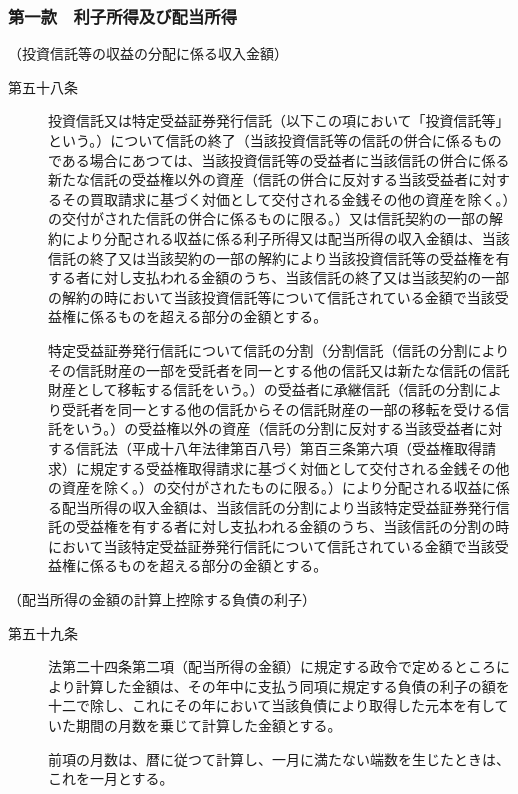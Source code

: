 \documentclass[twocolumn,a4j,10pt]{ltjtarticle}
\begin{document}
\subsubsection*{第一款　利子所得及び配当所得}
\noindent\hspace{10pt}（投資信託等の収益の分配に係る収入金額）
\begin{description}
\item[第五十八条]投資信託又は特定受益証券発行信託（以下この項において「投資信託等」という。）について信託の終了（当該投資信託等の信託の併合に係るものである場合にあつては、当該投資信託等の受益者に当該信託の併合に係る新たな信託の受益権以外の資産（信託の併合に反対する当該受益者に対するその買取請求に基づく対価として交付される金銭その他の資産を除く。）の交付がされた信託の併合に係るものに限る。）又は信託契約の一部の解約により分配される収益に係る利子所得又は配当所得の収入金額は、当該信託の終了又は当該契約の一部の解約により当該投資信託等の受益権を有する者に対し支払われる金額のうち、当該信託の終了又は当該契約の一部の解約の時において当該投資信託等について信託されている金額で当該受益権に係るものを超える部分の金額とする。
\item[]特定受益証券発行信託について信託の分割（分割信託（信託の分割によりその信託財産の一部を受託者を同一とする他の信託又は新たな信託の信託財産として移転する信託をいう。）の受益者に承継信託（信託の分割により受託者を同一とする他の信託からその信託財産の一部の移転を受ける信託をいう。）の受益権以外の資産（信託の分割に反対する当該受益者に対する信託法（平成十八年法律第百八号）第百三条第六項（受益権取得請求）に規定する受益権取得請求に基づく対価として交付される金銭その他の資産を除く。）の交付がされたものに限る。）により分配される収益に係る配当所得の収入金額は、当該信託の分割により当該特定受益証券発行信託の受益権を有する者に対し支払われる金額のうち、当該信託の分割の時において当該特定受益証券発行信託について信託されている金額で当該受益権に係るものを超える部分の金額とする。
\end{description}
\noindent\hspace{10pt}（配当所得の金額の計算上控除する負債の利子）
\begin{description}
\item[第五十九条]法第二十四条第二項（配当所得の金額）に規定する政令で定めるところにより計算した金額は、その年中に支払う同項に規定する負債の利子の額を十二で除し、これにその年において当該負債により取得した元本を有していた期間の月数を乗じて計算した金額とする。
\item[]前項の月数は、暦に従つて計算し、一月に満たない端数を生じたときは、これを一月とする。
\end{description}
\end{document}
